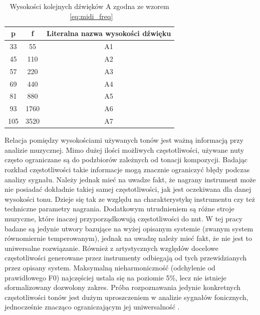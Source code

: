 \documentclass[12pt,a4paper,twoside]{mwart}
\begin{document}
\begin{table}[ht]
  \begin{center}
    \begin{tabular}{ |c|c|c| } 
    \hline
    p & f & Literalna nazwa wysokości dźwięku\\
    \hline
    33 & 55 & A1\\
    45 & 110 & A2\\
    57 & 220 & A3\\
    69 & 440 & A4\\
    81 & 880 & A5\\
    93 & 1760 & A6\\
    105 & 3520 & A7\\
    \hline
    \end{tabular}
  \end{center}
  \caption{Wysokości kolejnych dźwięków A zgodna ze wzorem ~\ref{eq:midi_freq}}
  \label{tab:FqMidi}
\end{table}

Relacja pomiędzy wysokościami używanych tonów jest ważną informacją przy analizie muzycznej. Mimo dużej ilości możliwych częstotliwości, używane nuty często ograniczane są do podzbiorów zależnych od tonacji kompozycji. Badając rozkład częstotliwości takie informacje mogą znacznie ograniczyć błędy podczas analizy sygnału. Należy jednak mieć na uwadze fakt, że nagrany instrument może nie posiadać dokładnie takiej samej częstotliwości, jak jest oczekiwana dla danej wysokości tonu. Dzieje się tak ze względu na charakterystykę instrumentu czy też techniczne parametry nagrania. Dodatkowym utrudnieniem są różne stroje muzyczne, które inaczej przyporządkowują częstotliwości do nut. W tej pracy badane są jedynie utwory bazujące na wyżej opisanym systemie (zwanym system równomiernie temperowanym), jednak na uwadzę należy mieć fakt, że nie jest to uniwersalne rozwiązanie. Również z artystycznych względów docelowe częstotliwości generowane przez instrumenty odbiegają od tych przewidzianych przez opisany system. Maksymalną nieharmoniczność (odchylenie od prawidłowego F0) najczęściej ustala się na poziomie 5\%, lecz nie istnieje sformalizowany dozwolony zakres. Próba rozpoznawania jedynie konkretnych częstotliwości tonów jest dużym uproszczeniem w analizie sygnałów fonicznych, jednocześnie znacząco ograniczającym jej uniwersalność 
\cite[64-65]{Homerecording:DlaKazdego}
\cite[7-11]{Transcription:Anssi:SignalProcessingMethods}.
\end{document}
